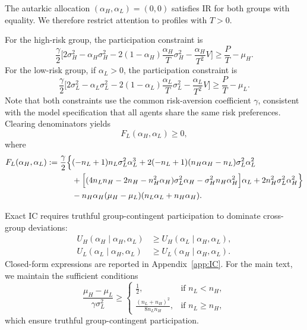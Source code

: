 \documentclass[a4paper,12pt]{article}
\theoremstyle{definition}
\theoremstyle{remark}
\newcommand{\1}{\mathbf{1}}
\begin{document}
The autarkic allocation \((\alpha_H,\alpha_L)=(0,0)\) satisfies IR for both groups with equality. We therefore restrict attention to profiles with \(T>0\).

For the high-risk group, the participation constraint is
\begin{equation}\label{eq:IRH-ind-new}
    \frac{\gamma}{2}\Big[
        2\sigma_H^2 - \alpha_H \sigma_H^2
        - 2(1-\alpha_H)\frac{\alpha_H}{T}\sigma_H^2
        - \frac{\alpha_H}{T^2} V
    \Big] \ge \frac{P}{T} - \mu_H.
\end{equation}
For the low-risk group, if \(\alpha_L>0\), the participation constraint is
\begin{equation}\label{eq:IRL-ind-new}
    \frac{\gamma}{2}\Big[
        2\sigma_L^2 - \alpha_L \sigma_L^2
        - 2(1-\alpha_L)\frac{\alpha_L}{T}\sigma_L^2
        - \frac{\alpha_L}{T^2} V
    \Big] \ge \frac{P}{T} - \mu_L.
\end{equation}
Note that both constraints use the common risk-aversion coefficient \(\gamma\), consistent with the model specification that all agents share the same risk preferences. Clearing denominators yields
\begin{equation}\label{eq:IRLcore-new}
F_L(\alpha_H,\alpha_L)\ge 0,
\end{equation}
where
\begin{align}
F_L(\alpha_H,\alpha_L)
:=
\frac{\gamma}{2}\Big\{&
    (-n_L+1)n_L \sigma_L^2 \alpha_L^3
    + 2(-n_L+1)(n_H \alpha_H - n_L)\sigma_L^2 \alpha_L^2 \notag\\
    &+ \Big[(4n_L n_H - 2n_H - n_H^2 \alpha_H)\sigma_L^2 \alpha_H - \sigma_H^2 n_H \alpha_H^2\Big]\alpha_L
    + 2n_H^2 \sigma_L^2 \alpha_H^2 \Big\}
\notag\\
&
- n_H \alpha_H (\mu_H - \mu_L)(n_L \alpha_L + n_H \alpha_H).
\label{eq:FL-expanded-new}
\end{align}

Exact IC requires truthful group-contingent participation to dominate cross-group deviations:
\begin{subequations}\label{eq:IC-ind-new}
\begin{align}
U_H(\alpha_H\mid \alpha_H,\alpha_L)
&\ge
U_H(\alpha_L\mid \alpha_H,\alpha_L),
\\
U_L(\alpha_L\mid \alpha_H,\alpha_L)
&\ge
U_L(\alpha_H\mid \alpha_H,\alpha_L).
\end{align}
\end{subequations}
Closed-form expressions are reported in Appendix~\ref{app:IC}. For the main text, we maintain the sufficient conditions
\begin{equation}\label{eq:IC-conditions-new}
    \frac{\mu_H - \mu_L}{\gamma \sigma_L^2} \ge 
    \begin{cases}
        \tfrac{1}{2}, & \text{if } n_L < n_H,\\[6pt]
        \displaystyle \frac{(n_L + n_H)^2}{8 n_L n_H},
        & \text{if } n_L \ge n_H,
    \end{cases}
\end{equation}
which ensure truthful group-contingent participation.
\end{document}
